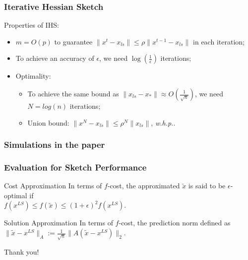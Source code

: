 \documentclass{beamer}
\begin{document}
\begin{frame}
    \frametitle{Iterative Hessian Sketch}

    Properties of IHS:
    \begin{itemize}
        \item<1-> $m = O(p)$ to guarantee $\|x^t - x_{ls}\| \leq \rho
            \|x^{t-1} - x_{ls}\|$ in each iteration;
        \item<2-> To achieve an accuracy of $\epsilon$, we need
            $\log(\frac{1}{\epsilon})$ iterations;
        \item<3-> Optimality:
            \begin{itemize}
                \item<3-> To achieve the same bound as $\|x_{ls} - x_*\|\approx
                    O(\frac{1}{\sqrt{n}})$, we need $N=log(n)$ iterations;
                \item<4-> Union bound: $\|x^N - x_{ls}\| \leq
                    \rho^N \|x_{ls}\|$, \textit{w.h.p.}.
            \end{itemize}
    \end{itemize}
\end{frame}

\begin{frame}
    \frametitle{Simulations in the paper}
\end{frame}

\begin{frame}
    \frametitle{Evaluation for Sketch Performance}
    \begin{block}{Cost Approximation}
        In terms of $f$-cost, the approximated $\tilde{x}$ is said to be $\epsilon$-optimal if \\
        \vspace{.5cm}
        $f(x^{LS}) \leq f(\tilde{x}) \leq (1+\epsilon)^2 f(x^{LS})$.
    \end{block}
    
    \begin{block}{Solution Approximation}
        In terms of $f$-cost, the prediction norm defined as \\
        \vspace{.5cm}
        $\|\tilde{x} - x^{LS}\|_A := \frac{1}{\sqrt{n}} \|A(\tilde{x} - x^{LS})\|_2$.
    \end{block}
\end{frame}


\begin{frame}
    \begin{center}
        \Large Thank you!
    \end{center}
\end{frame}
\end{document}
